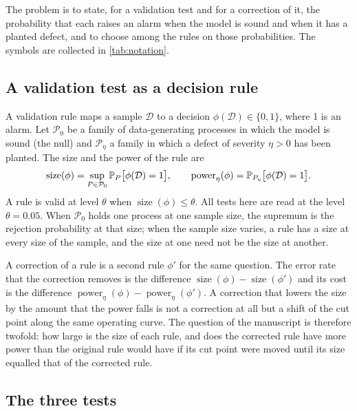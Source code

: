 The problem is to state, for a validation test and for a correction of it, the probability that each raises an alarm when the model is sound and when it has a planted defect, and to choose among the rules on those probabilities. The symbols are collected in \cref{tab:notation}.



\subsection{A validation test as a decision rule}

A validation rule maps a sample $\mathcal{D}$ to a decision $\phi(\mathcal{D})\in\{0,1\}$, where 1 is an alarm. Let $\mathcal{P}_0$ be a family of data-generating processes in which the model is sound (the null) and $\mathcal{P}_\eta$ a family in which a defect of severity $\eta>0$ has been planted. The size and the power of the rule are
\begin{equation}
\operatorname{size}(\phi)=\sup_{P\in\mathcal{P}_0}\mathbb{P}_P\bigl[\phi(\mathcal{D})=1\bigr],\qquad
\operatorname{power}_\eta(\phi)=\mathbb{P}_{P_\eta}\bigl[\phi(\mathcal{D})=1\bigr].
\label{eq:size-power}
\end{equation}
A rule is valid at level $\theta$ when $\operatorname{size}(\phi)\le\theta$. All tests here are read at the level $\theta=0.05$. When $\mathcal{P}_0$ holds one process at one sample size, the supremum is the rejection probability at that size; when the sample size varies, a rule has a size at every size of the sample, and the size at one need not be the size at another.

A correction of a rule is a second rule $\phi'$ for the same question. The error rate that the correction removes is the difference $\operatorname{size}(\phi)-\operatorname{size}(\phi')$ and its cost is the difference $\operatorname{power}_\eta(\phi)-\operatorname{power}_\eta(\phi')$. A correction that lowers the size by the amount that the power falls is not a correction at all but a shift of the cut point along the same operating curve. The question of the manuscript is therefore twofold: how large is the size of each rule, and does the corrected rule have more power than the original rule would have if its cut point were moved until its size equalled that of the corrected rule.

\subsection{The three tests}

